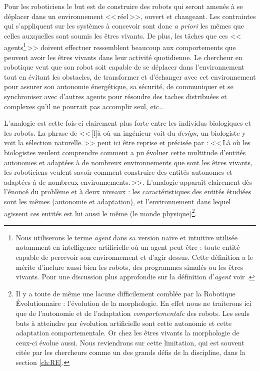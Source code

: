 Pour les roboticiens le but est de construire des robots qui seront amenés à se déplacer dans un environnement <<\,réel\,>>, ouvert et changeant. Les contraintes qui s'appliquent sur les systèmes à concevoir sont donc \emph{a priori} les mêmes que celles auxquelles sont soumis les êtres vivants. De plus, les t\^{a}ches que ces <<\,agents\footnote{Nous utiliserons le terme \emph{agent} dans sa version naïve et intuitive utilisée notamment en intelligence artificielle où un agent peut être : toute entité capable de percevoir son environnement et d'agir dessus. Cette définition a le mérite d'inclure aussi bien les robots, des programmes simulés ou les êtres vivants. Pour une discussion plus approfondie sur la définition d'\emph{agent} voir \citet{barandiaran09definingagencyindividualitynormativityasymmetryspatiotemporalityaction}.}\,>> doivent effectuer ressemblent beaucoup aux comportements que peuvent avoir les êtres vivants dans leur activité quotidienne. Le chercheur en robotique veut que son robot soit capable de se déplacer dans l'environnement tout en évitant les obstacles, de transformer et d'échanger avec cet environnement pour assurer son autonomie énergétique, sa sécurité, de communiquer et se synchroniser avec d'autres agents pour résoudre des taches distribuées et complexes qu'il ne pourrait pas accomplir seul, etc..

L'analogie est cette fois-ci clairement plus forte entre les individus biologiques et les robots. La phrase de \cite{maynardsmith00theconceptofinformationinbiology} <<\,[l]à où un ingénieur voit du \emph{design}, un biologiste y voit la sélection naturelle.\,>> peut ici être reprise et précisée par :
<<\,Là où les biologistes veulent comprendre comment a pu évoluer cette multitude d'entités autonomes et adaptées à de nombreux environnements que sont les êtres vivants, les roboticiens veulent savoir comment construire des entités autonomes et adaptées à de nombreux environnements.\,>>. L'analogie apparaît clairement dès l'énoncé du problème et à deux niveaux : les caractéristiques des entités étudiées sont les mêmes (autonomie et adaptation), et l'environnement dans lequel agissent ces entités est lui aussi le même (le monde physique)\footnote{Il y a toute de même une lacune difficilement comblée par la Robotique \'Evolutionnaire : l'évolution de la morphologie. En effet nous ne traiterons ici que de l'autonomie et de l'adaptation \emph{comportementale} des robots. Les seuls buts à atteindre par évolution artificielle sont cette autonomie et cette adaptation comportementale. Or chez les êtres vivants la morphologie de ceux-ci évolue aussi. Nous reviendrons sur cette limitation, qui est souvent citée par les chercheurs comme un des grands défis de la discipline, dans la section \ref{ch:RE}.}.  

